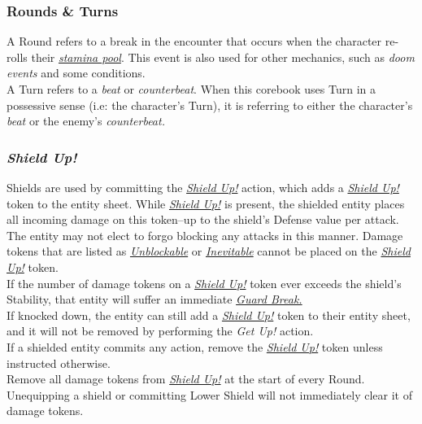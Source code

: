 \documentclass[12pt]{article}
\newcommand{\reftoit}[1]{\hyperlink{#1}{\emph{#1}}}
\begin{document}
\begin{multicols*}{2}
\subsubsection{Rounds \& Turns}
A Round refers to a break in the encounter that occurs when the character re-rolls their \reftoit{stamina pool}. This event is also used for other mechanics, such as \emph{doom events} and some conditions.\\
A Turn refers to a \emph{beat} or \emph{counterbeat}. When this corebook uses Turn in a possessive sense (i.e: the character’s Turn), it is referring to either the character’s \emph{beat} or the enemy’s \emph{counterbeat.}

\subsubsection{\emph{Shield Up!}}
\hypertarget{Shield Up!}{}
Shields are used by committing the \reftoit{Shield Up!} action, which adds a \reftoit{Shield Up!} token to the entity sheet. While \reftoit{Shield Up!} is present, the shielded entity places all incoming damage on this token--up to the shield’s Defense value per attack. The entity may not elect to forgo blocking any attacks in this manner. Damage tokens that are listed as \reftoit{Unblockable} or \reftoit{Inevitable} cannot be placed on the \reftoit{Shield Up!} token.\\
If the number of damage tokens on a \reftoit{Shield Up!} token ever exceeds the shield’s Stability, that entity will suffer an immediate \reftoit{Guard Break.}\\
If knocked down, the entity can still add a \reftoit{Shield Up!} token to their entity sheet, and it will not be removed by performing the \emph{Get Up!} action.\\
If a shielded entity commits any action, remove the \reftoit{Shield Up!} token unless instructed otherwise.\\
Remove all damage tokens from \reftoit{Shield Up!} at the start of every Round.\\
Unequipping a shield or committing Lower Shield will not immediately clear it of damage tokens.


\end{multicols*}
\end{document}
